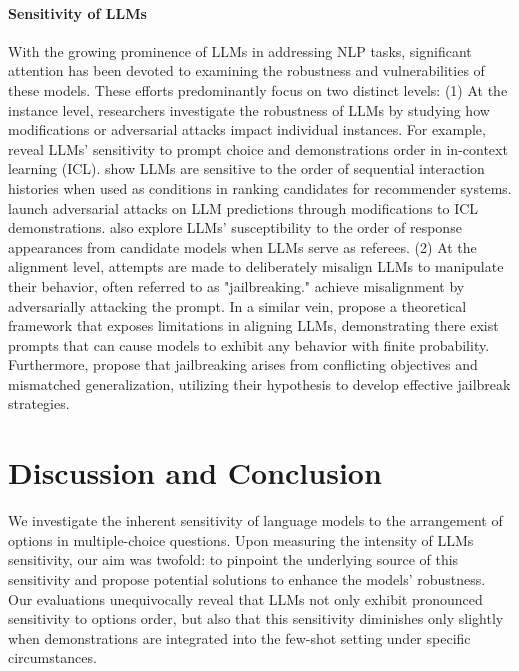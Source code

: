 \documentclass[11pt]{article}
\begin{document}
\paragraph{Sensitivity of LLMs} 
With the growing prominence of LLMs in addressing NLP tasks, significant attention has been devoted to examining the robustness and vulnerabilities of these models. These efforts predominantly focus on two distinct levels:
(1) At the instance level, researchers investigate the robustness of LLMs by studying how modifications or adversarial attacks impact individual instances. For example, \citet{zhao2021calibrate} reveal LLMs' sensitivity to prompt choice and demonstrations order in in-context learning (ICL). 
\citet{hou2023large} show LLMs are sensitive to the order of sequential interaction histories when used as conditions in ranking candidates for recommender systems. 
\citet{wang2023adversarial} launch adversarial attacks on LLM predictions through modifications to ICL demonstrations. \citet{wang2023large} also explore LLMs' susceptibility to the order of response appearances from candidate models when LLMs serve as referees. 
(2) At the alignment level, attempts are made to deliberately misalign LLMs to manipulate their behavior, often referred to as "jailbreaking." \citet{perez2022ignore,zou2023universal} achieve misalignment by adversarially attacking the prompt. In a similar vein, \citep{wolf2023fundamental} propose a theoretical framework that exposes limitations in aligning LLMs, demonstrating there exist prompts that can cause models to exhibit any behavior with finite probability. Furthermore, \citet{wei2023jailbroken} propose that jailbreaking arises from conflicting objectives and mismatched generalization, utilizing their hypothesis to develop effective jailbreak strategies.



\section{Discussion and Conclusion}
We investigate the inherent sensitivity of language models to the arrangement of options in multiple-choice questions. Upon measuring the intensity of LLMs sensitivity, our aim was twofold: to pinpoint the underlying source of this sensitivity and propose potential solutions to enhance the models' robustness. 
Our evaluations unequivocally reveal that LLMs not only exhibit pronounced sensitivity to options order, but also that this sensitivity diminishes only slightly when demonstrations are integrated into the few-shot setting under specific circumstances.
\end{document}
